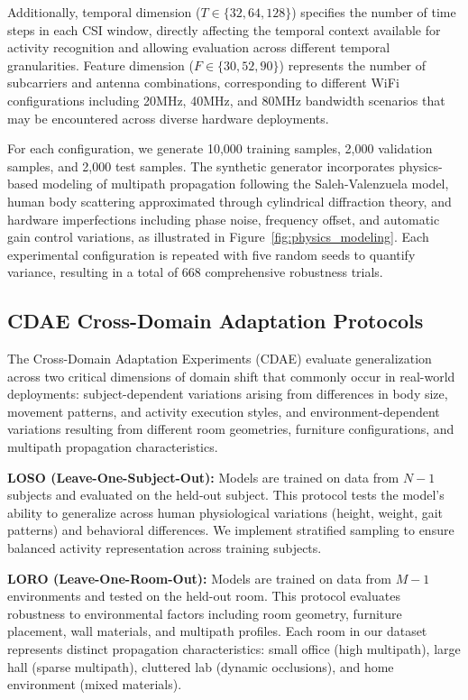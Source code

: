 \documentclass[journal]{IEEEtran}
\begin{document}
Additionally, temporal dimension ($T \in \{32, 64, 128\}$) specifies the number of time steps in each CSI window, directly affecting the temporal context available for activity recognition and allowing evaluation across different temporal granularities. Feature dimension ($F \in \{30, 52, 90\}$) represents the number of subcarriers and antenna combinations, corresponding to different WiFi configurations including 20MHz, 40MHz, and 80MHz bandwidth scenarios that may be encountered across diverse hardware deployments.

For each configuration, we generate 10,000 training samples, 2,000 validation samples, and 2,000 test samples. The synthetic generator incorporates physics-based modeling of multipath propagation following the Saleh-Valenzuela model, human body scattering approximated through cylindrical diffraction theory, and hardware imperfections including phase noise, frequency offset, and automatic gain control variations, as illustrated in Figure~\ref{fig:physics_modeling}. Each experimental configuration is repeated with five random seeds to quantify variance, resulting in a total of 668 comprehensive robustness trials.

\subsection{CDAE Cross-Domain Adaptation Protocols}

The Cross-Domain Adaptation Experiments (CDAE) evaluate generalization across two critical dimensions of domain shift that commonly occur in real-world deployments: subject-dependent variations arising from differences in body size, movement patterns, and activity execution styles, and environment-dependent variations resulting from different room geometries, furniture configurations, and multipath propagation characteristics.

\textbf{LOSO (Leave-One-Subject-Out):} Models are trained on data from $N-1$ subjects and evaluated on the held-out subject. This protocol tests the model's ability to generalize across human physiological variations (height, weight, gait patterns) and behavioral differences. We implement stratified sampling to ensure balanced activity representation across training subjects.

\textbf{LORO (Leave-One-Room-Out):} Models are trained on data from $M-1$ environments and tested on the held-out room. This protocol evaluates robustness to environmental factors including room geometry, furniture placement, wall materials, and multipath profiles. Each room in our dataset represents distinct propagation characteristics: small office (high multipath), large hall (sparse multipath), cluttered lab (dynamic occlusions), and home environment (mixed materials).
\end{document}
